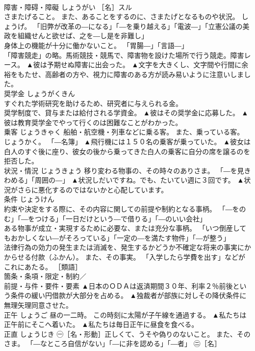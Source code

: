 \documentclass[8pt]{extreport}
\begin{document}
\begin{CJK}{UTF8}{min}
\\	障害・障碍・障礙	しょうがい	［名］スル 
\\	さまたげること。 また、あることをするのに、さまたげとなるものや状況。 しょうげ。 「旧弊が改革の―になる」「―を乗り越える」「電波―」「立憲公議の美政を組織せんと欲せば、之を―し是を非難し」 
\\	身体上の機能が十分に働かないこと。 「胃腸―」「言語―」 
\\	「障害競走」の略。馬術競技・競馬で、障害物を設けた場所で行う競走。障害レース。	▲彼は予期せぬ障害に出会った。 ▲文字を大きくし、文字間や行間に余裕をもたせ、高齢者の方や、視力に障害のある方が読み易いように注意いしました。
\\	奨学金	しょうがくきん	
\\	すぐれた学術研究を助けるため、研究者に与えられる金。 
\\	奨学制度で、貸与または給付される学資金。	▲彼はその奨学金に応募した。 ▲彼は教育奨学金でやって行くのは困難なことがわかった。
\\	乗客	じょうきゃく	船舶・航空機・列車などに乗る客。 また、乗っている客。 じょうかく。 「―名簿」	▲飛行機には１５０名の乗客が乗っていた。 ▲彼女は白人のすぐ後に座り、彼女の後から乗ってきた白人の乗客に自分の席を譲るのを拒否した。
\\	状況・情況	じょうきょう	移り変わる物事の、その時々のありさま。 「―を見きわめる」「周囲の―」	▲状況しだいですね。でも、たいてい週に３回です。 ▲状況がさらに悪化するのではないかと心配しています。
\\	条件	じょうけん	
\\	約束や決定をする際に、その内容に関しての前提や制約となる事柄。 「―をのむ」「―をつける」「一日だけという―で借りる」「―のいい会社」 
\\	ある物事が成立・実現するために必要な、または充分な事柄。 「いつ倒産してもおかしくない―がそろっている」「一定の―を満たす物件」「―が整う」 
\\	法律行為の効力の発生または消滅を、発生するかどうか不確定な将来の事実にかからせる付款（ふかん）。 また、その事実。 「入学したら学費を出す」などがこれにあたる。 ［類語］
\\	箇条・条項・限定・制約／
\\	前提・与件・要件・要素	▲日本のＯＤＡは返済期間３０年、利率２％前後という条件の緩い円借款が大部分を占める。 ▲独裁者が部族に対しその降伏条件に無理矢理同意させた。
\\	正午	しょうご	昼の一二時。 この時刻に太陽が子午線を通過する。	▲私たちは正午前にそこへ着いた。 ▲私たちは毎日正午に昼食を食べる。
\\	正直	しょうじき	㊀［名・形動］正しくて、うそや偽りのないこと。 また、そのさま。 「―なところ自信がない」「―に非を認める」「―者」 ㊁［名］ 

\end{CJK}
\end{document}
